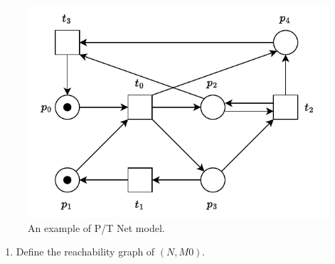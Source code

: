 \begin{figure}[!htp]
    \centering
    \includegraphics[width=.7\textwidth]{img/reachability-graph-1.pdf}
    \caption{An example of P/T Net model.}
    \label{fig: example of P/T Net model}
\end{figure}

\questionproblem
\begin{enumerate}
    \item Define the reachability graph of $\left(N, M0\right)$.
\end{enumerate}

